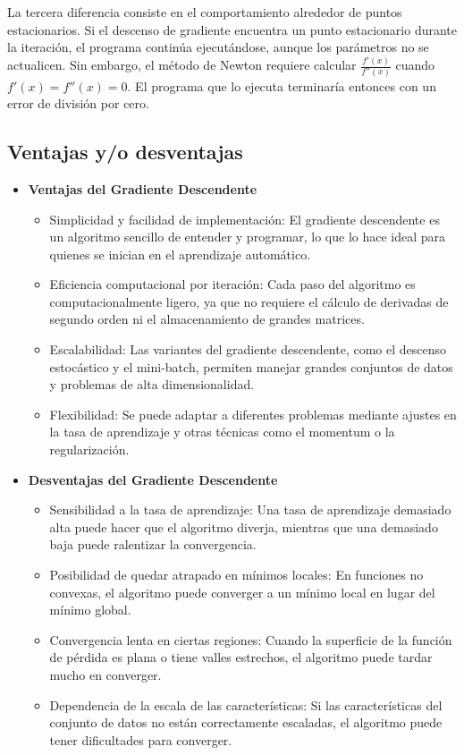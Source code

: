 \documentclass[conference]{IEEEtran}
\begin{document}
La tercera diferencia consiste en el comportamiento alrededor de puntos estacionarios. Si el descenso de gradiente encuentra un punto estacionario durante la iteración, el programa continúa ejecutándose, aunque los parámetros no se actualicen. Sin embargo, el método de Newton requiere calcular $\frac{f'(x)}{f''(x)}$ cuando $f'(x) = f''(x) = 0$. El programa que lo ejecuta terminaría entonces con un error de división por cero.

\subsection{Ventajas y/o desventajas}
\begin{itemize}
    \item \textbf{Ventajas del Gradiente Descendente}
    \begin{itemize}
        \item Simplicidad y facilidad de implementación:
El gradiente descendente es un algoritmo sencillo de entender y programar, lo que lo hace ideal para quienes se inician en el aprendizaje automático.
        \item Eficiencia computacional por iteración:
Cada paso del algoritmo es computacionalmente ligero, ya que no requiere el cálculo de derivadas de segundo orden ni el almacenamiento de grandes matrices.
        \item Escalabilidad:
Las variantes del gradiente descendente, como el descenso estocástico y el mini-batch, permiten manejar grandes conjuntos de datos y problemas de alta dimensionalidad.
        \item Flexibilidad:
Se puede adaptar a diferentes problemas mediante ajustes en la tasa de aprendizaje y otras técnicas como el momentum o la regularización.
    \end{itemize}
    
    \item \textbf{Desventajas del Gradiente Descendente}
    \begin{itemize}
        \item Sensibilidad a la tasa de aprendizaje:
Una tasa de aprendizaje demasiado alta puede hacer que el algoritmo diverja, mientras que una demasiado baja puede ralentizar la convergencia.
        \item Posibilidad de quedar atrapado en mínimos locales:
En funciones no convexas, el algoritmo puede converger a un mínimo local en lugar del mínimo global.
        \item Convergencia lenta en ciertas regiones:
Cuando la superficie de la función de pérdida es plana o tiene valles estrechos, el algoritmo puede tardar mucho en converger.
        \item Dependencia de la escala de las características:
Si las características del conjunto de datos no están correctamente escaladas, el algoritmo puede tener dificultades para converger.
    \end{itemize}
\end{itemize}
\end{document}
